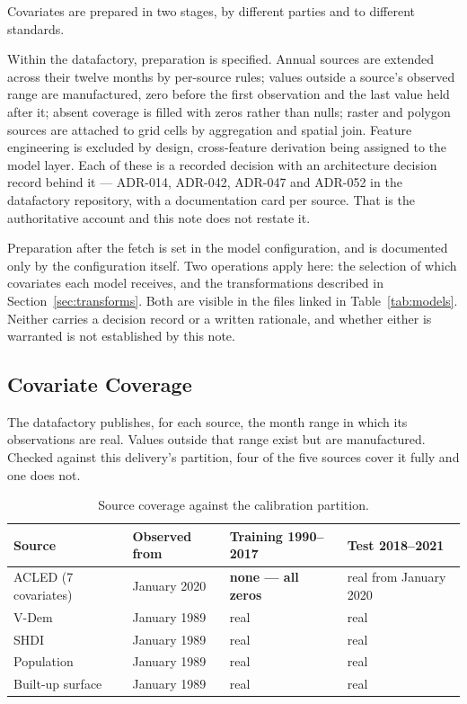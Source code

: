 Covariates are prepared in two stages, by different parties and to different standards.

Within the datafactory, preparation is specified. Annual sources are extended across their twelve
months by per-source rules; values outside a source's observed range are manufactured, zero before
the first observation and the last value held after it; absent coverage is filled with zeros rather
than nulls; raster and polygon sources are attached to grid cells by aggregation and spatial join.
Feature engineering is excluded by design, cross-feature derivation being assigned to the model
layer. Each of these is a recorded decision with an architecture decision record behind it ---
ADR-014, ADR-042, ADR-047 and ADR-052 in the datafactory repository, with a documentation card per
source. That is the authoritative account and this note does not restate it.

Preparation after the fetch is set in the model configuration, and is documented only by the
configuration itself. Two operations apply here: the selection of which covariates each model
receives, and the transformations described in Section~\ref{sec:transforms}. Both are visible in
the files linked in Table~\ref{tab:models}. Neither carries a decision record or a written
rationale, and whether either is warranted is not established by this note.

\subsection*{Covariate Coverage}

The datafactory publishes, for each source, the month range in which its observations are real.
Values outside that range exist but are manufactured. Checked against this delivery's partition,
four of the five sources cover it fully and one does not.

\begin{table}[h!]
\centering
\small
\renewcommand{\arraystretch}{1.2}
\caption{Source coverage against the calibration partition.}
\label{tab:coverage}
\begin{tabular}{@{}p{3.4cm}p{2.7cm}p{3.5cm}p{3.6cm}@{}}
\toprule
\textbf{Source} & \textbf{Observed from} & \textbf{Training 1990--2017} & \textbf{Test 2018--2021} \\ \midrule
ACLED (7 covariates) & January 2020 & \textbf{none --- all zeros} & real from January 2020 \\
V-Dem                & January 1989 & real & real \\
SHDI                 & January 1989 & real & real \\
Population           & January 1989 & real & real \\
Built-up surface     & January 1989 & real & real \\
\bottomrule
\end{tabular}
\end{table}

